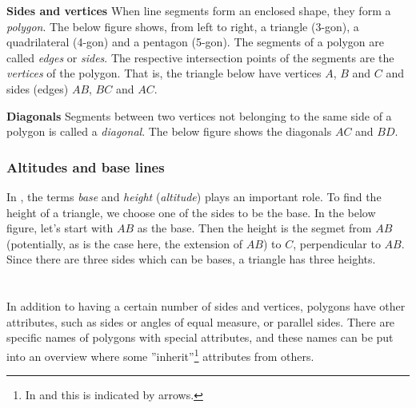 \begin{comment}
\reg[Samsvarande vinklar]{
	Vinkler med eit høgre eller venstre vinkelbein felles, kallast \textit{samsvarende vinkler}. I figuren under er dei markerte vinklane samsvarande fordi alle tre har den raude linja som venstre vinkelbein.
\fig{vink4}
	Vinklar med parvis parallelle høgre og venstre vinkelbein er like store.
\fig{vink4b}
}
\end{comment}
\newpage
\textbf{Sides and vertices} \os
When line segments form an enclosed shape, they form a \textit{polygon}. The below figure shows, from left to right, a triangle (3-gon), a quadrilateral (4-gon) and a pentagon (5-gon).
The segments of a polygon are called \textit{edges} or \textit{sides}. The respective intersection points of the segments are the \textit{vertices} of the polygon. That is, the triangle below have vertices $ A $, $ B $ and $ C $ and sides (edges) $ AB $, $ BC $ and $ AC $.
 \vsk

\textbf{Diagonals} \os
Segments between two vertices not belonging to the same side of a polygon is called a \textit{diagonal}. The below figure shows the diagonals $ AC $ and $ BD $.
\newpage
\subsubsection{Altitudes and base lines}
In , the terms \textit{base} and \textit{height} (\textit{altitude}) plays an important role. To find the height of a triangle, we choose one of the sides to be the base. In the below figure, let's start with $ AB $ as the base. Then the height is the segmet from $ AB $  (potentially, as is the case here, the extension of $ AB $) to $ C $, perpendicular to $ AB $.
Since there are three sides which can be bases, a triangle has three heights.
\section{\eignsk}
In addition to having a certain number of sides and vertices, polygons have other attributes, such as sides or angles of equal measure, or parallel sides. There are specific names of polygons with special attributes, and these names can be put into an overview where some ''inherit''\footnote{In  and  this is indicated by arrows.} attributes from others.\regv


